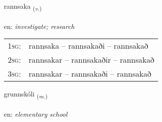 \documentclass[frontgrid, backgrid]{flacards}\usepackage[]{graphicx}\usepackage[]{color}
\begin{document}
\renewcommand{\flhead}{\vskip5pt \fboxsep=0pt {\small\bfseries\footnotesize Sagnorð | Verb}}
\renewcommand{\fcfoot}{\vskip5pt \fboxsep=0pt \hspace{2pt}{\small\bfseries\footnotesize 2K}}

\renewcommand{\blhead}{\vskip5pt {\small\bfseries\footnotesize Sagnorð | Verb }}
\renewcommand{\bcfoot}{\vskip5pt \hspace{2pt}{\small\bfseries\footnotesize 2K}}


{rannsaka \small{\textsubscript{(\textit{v.})}} \\[1ex] %
\textphonetic{[ransaka]} \\
en: \emph{investigate; research} \\  [2ex]
\renewcommand*{\arraystretch}{0.8}
\begin{tabular}{p{1cm}l}
\textsc{1sg}: & rannsaka -- rannsakaði -- rannsakað \\ 
\textsc{2sg}: & rannsakar -- rannsakaðir -- rannsakað \\ 
\textsc{3sg}: & rannsakar -- rannsakaði -- rannsakað \\ 
\end{tabular}
}

\renewcommand{\flhead}{\vskip5pt \fboxsep=0pt {\small\bfseries\footnotesize Nafnorð | Noun}}
\renewcommand{\fcfoot}{\vskip5pt \fboxsep=0pt \hspace{2pt}{\small\bfseries\footnotesize 2K}}

\renewcommand{\blhead}{\vskip5pt {\small\bfseries\footnotesize Nafnorð | Noun }}
\renewcommand{\bcfoot}{\vskip5pt \hspace{2pt}{\small\bfseries\footnotesize 2K}}


{grunnskóli \small{\textsubscript{(\textit{m.})}} \\[1ex] %
\textphonetic{[krʏnskoulɪ]} \\
en: \emph{elementary school} \\  [2ex]
\renewcommand*{\arraystretch}{0.8}
}
\end{document}
